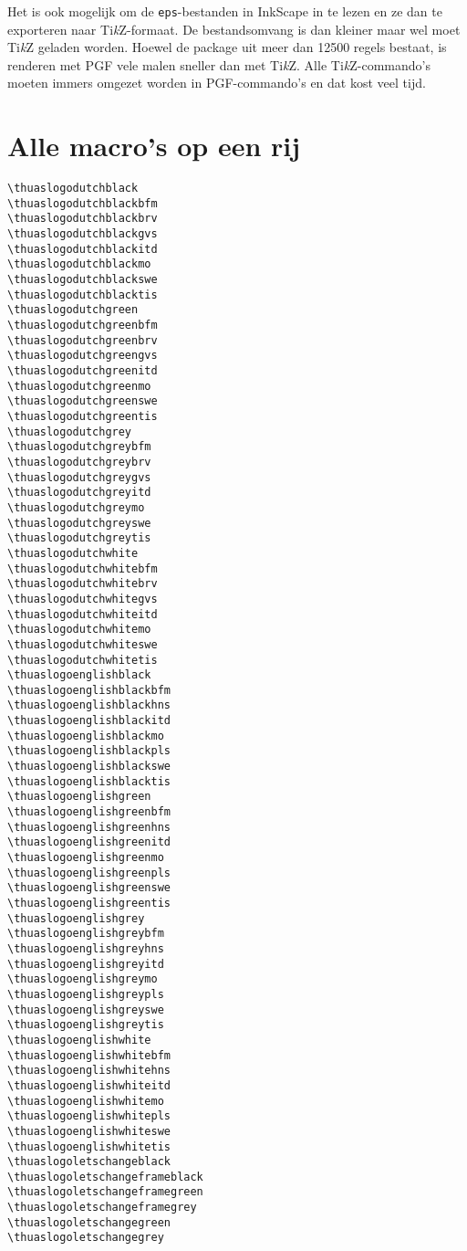 \documentclass[a4paper,12pt]{article}
\begin{document}
Het is ook mogelijk om de \verb|eps|-bestanden in InkScape in te lezen en ze dan te exporteren naar
Ti\emph{k}Z-formaat. De bestandsomvang is dan kleiner maar wel moet Ti\emph{k}Z geladen worden.
Hoewel de package uit meer dan 12500 regels bestaat, is renderen met PGF vele malen sneller dan met
Ti\emph{k}Z. Alle Ti\emph{k}Z-commando's moeten immers omgezet worden in PGF-commando's en dat kost
veel tijd.


\section{Alle macro's op een rij}
\begin{verbatim}
\thuaslogodutchblack
\thuaslogodutchblackbfm
\thuaslogodutchblackbrv
\thuaslogodutchblackgvs
\thuaslogodutchblackitd
\thuaslogodutchblackmo
\thuaslogodutchblackswe
\thuaslogodutchblacktis
\thuaslogodutchgreen
\thuaslogodutchgreenbfm
\thuaslogodutchgreenbrv
\thuaslogodutchgreengvs
\thuaslogodutchgreenitd
\thuaslogodutchgreenmo
\thuaslogodutchgreenswe
\thuaslogodutchgreentis
\thuaslogodutchgrey
\thuaslogodutchgreybfm
\thuaslogodutchgreybrv
\thuaslogodutchgreygvs
\thuaslogodutchgreyitd
\thuaslogodutchgreymo
\thuaslogodutchgreyswe
\thuaslogodutchgreytis
\thuaslogodutchwhite
\thuaslogodutchwhitebfm
\thuaslogodutchwhitebrv
\thuaslogodutchwhitegvs
\thuaslogodutchwhiteitd
\thuaslogodutchwhitemo
\thuaslogodutchwhiteswe
\thuaslogodutchwhitetis
\thuaslogoenglishblack
\thuaslogoenglishblackbfm
\thuaslogoenglishblackhns
\thuaslogoenglishblackitd
\thuaslogoenglishblackmo
\thuaslogoenglishblackpls
\thuaslogoenglishblackswe
\thuaslogoenglishblacktis
\thuaslogoenglishgreen
\thuaslogoenglishgreenbfm
\thuaslogoenglishgreenhns
\thuaslogoenglishgreenitd
\thuaslogoenglishgreenmo
\thuaslogoenglishgreenpls
\thuaslogoenglishgreenswe
\thuaslogoenglishgreentis
\thuaslogoenglishgrey
\thuaslogoenglishgreybfm
\thuaslogoenglishgreyhns
\thuaslogoenglishgreyitd
\thuaslogoenglishgreymo
\thuaslogoenglishgreypls
\thuaslogoenglishgreyswe
\thuaslogoenglishgreytis
\thuaslogoenglishwhite
\thuaslogoenglishwhitebfm
\thuaslogoenglishwhitehns
\thuaslogoenglishwhiteitd
\thuaslogoenglishwhitemo
\thuaslogoenglishwhitepls
\thuaslogoenglishwhiteswe
\thuaslogoenglishwhitetis
\thuaslogoletschangeblack
\thuaslogoletschangeframeblack
\thuaslogoletschangeframegreen
\thuaslogoletschangeframegrey
\thuaslogoletschangegreen
\thuaslogoletschangegrey
\end{verbatim}
\end{document}
